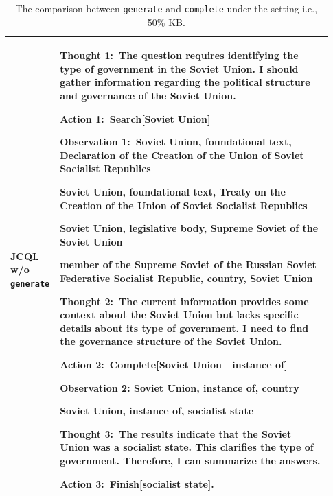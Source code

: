 \begin{table}[t!]
\begin{tabular}{>{\hspace{0pt}}m{0.1\linewidth}|>{\hspace{0pt}}m{0.83\linewidth}}
\rowcolor[rgb]{0.9490,0.9490,0.9490} JCQL w/o \texttt{generate}                     & Thought 1:~The question requires identifying the type of government in the Soviet Union. I should gather information regarding the political structure and governance of the Soviet Union.\par{}Action 1:~Search[Soviet Union]\par{}Observation 1:~Soviet Union, foundational text, Declaration of the Creation of the Union of Soviet Socialist Republics\par{}Soviet Union, foundational text, Treaty on the Creation of the Union of Soviet Socialist Republics\par{}Soviet Union, legislative body, Supreme Soviet of the Soviet Union\par{}member of the Supreme Soviet of the Russian Soviet Federative Socialist Republic, country, Soviet Union\par\null\par{}Thought 2:~The current information provides some context about the Soviet Union but lacks specific details about its type of government. I need to find the governance structure of the Soviet Union.\par{}Action 2:~\textcolor[rgb]{0.4549,0.7137,0.0078}{Complete[Soviet Union | instance of]}\par{}Observation 2: Soviet Union, instance of, country\par{}Soviet Union, instance of, \textcolor[rgb]{0,0.4392,0.7529}{socialist state}\par\null\par{}Thought 3:~The results indicate that the Soviet Union was a socialist state. This clarifies the type of government. Therefore, I can summarize the answers.\par{}Action 3:~Finish[\textcolor[rgb]{0,0.4392,0.7529}{socialist state}]. \\
\hline
\end{tabular}
\caption{The comparison between \texttt{generate} and \texttt{complete} under the setting i.e., 50\% KB.}
\label{tab:cmp_gog}
\end{table}
\renewcommand{\arraystretch}{1}